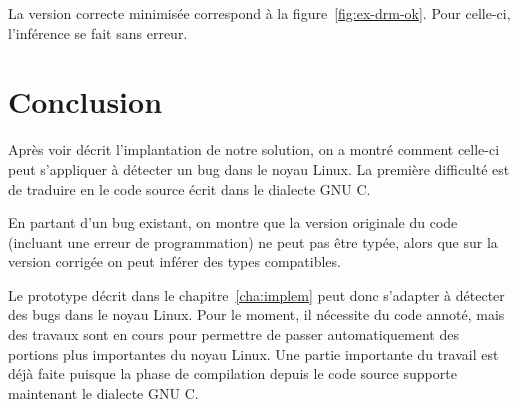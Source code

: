 La version correcte minimisée correspond à la figure~\ref{fig:ex-drm-ok}. Pour
celle-ci, l'inférence se fait sans erreur.


\section*{Conclusion}

Après voir décrit l'implantation de notre solution, on a montré comment celle-ci
peut s'appliquer à détecter un bug dans le noyau Linux. La première difficulté
est de traduire en \newspeak le code source écrit dans le dialecte GNU C.


En partant d'un bug existant, on montre que la version originale du code
(incluant une erreur de programmation) ne peut pas être typée, alors que sur la
version corrigée on peut inférer des types compatibles.

Le prototype décrit dans le chapitre~\ref{cha:implem} peut donc s'adapter à
détecter des bugs dans le noyau Linux. Pour le moment, il nécessite du code
annoté, mais des travaux sont en cours pour permettre de passer automatiquement
des portions plus importantes du noyau Linux. Une partie importante du travail
est déjà faite puisque la phase de compilation depuis le code source supporte
maintenant le dialecte GNU C.



